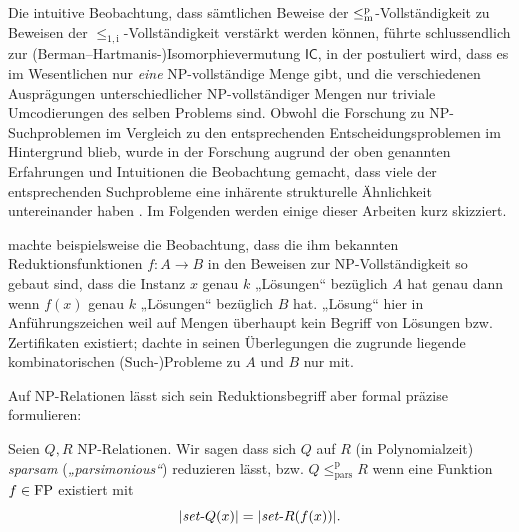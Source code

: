 Die intuitive Beobachtung, dass sämtlichen Beweise der $\leq_\mathrm{m}^\mathrm{p}$-Vollständigkeit zu Beweisen der $\leq_\mathrm{1,i}$-Vollständigkeit verstärkt werden können, führte schlussendlich zur (Berman--Hartmanis-)Isomorphievermutung $\mathsf{IC}$, in der postuliert wird, dass es im Wesentlichen nur \emph{eine} NP-vollständige Menge gibt, und die verschiedenen Ausprägungen unterschiedlicher NP-vollständiger Mengen nur triviale Umcodierungen des selben Problems sind.
Obwohl die Forschung zu NP-Suchproblemen im Vergleich zu den entsprechenden Entscheidungsproblemen im Hintergrund blieb, wurde in der Forschung augrund der oben genannten Erfahrungen und Intuitionen die Beobachtung gemacht, dass viele der entsprechenden Suchprobleme eine inhärente strukturelle Ähnlichkeit untereinander haben \parencite[vgl. auch die Diskussion von][]{hemaspaandra_take-home_1998}.
Im Folgenden werden einige dieser Arbeiten kurz skizziert.

\textcite[83]{simon_central_1975} machte beispielsweise die Beobachtung, dass die ihm bekannten Reduktionsfunktionen $f\colon A\to B$ in den Beweisen zur NP-Vollständigkeit so gebaut sind, dass die Instanz $x$ genau $k$ „Lösungen“ bezüglich $A$ hat genau dann wenn $f(x)$ genau $k$ „Lösungen“ bezüglich $B$ hat. „Lösung“ hier in Anführungszeichen weil auf Mengen überhaupt kein Begriff von Lösungen bzw. Zertifikaten existiert; \citeauthor{simon_central_1975} dachte in seinen Überlegungen die zugrunde liegende kombinatorischen (Such-)Probleme zu $A$ und $B$ nur mit.

Auf NP-Relationen lässt sich sein Reduktionsbegriff aber formal präzise formulieren:
\begin{definition}
    Seien $Q, R$ NP-Relationen. Wir sagen dass sich $Q$ auf $R$ (in Polynomialzeit) \emph{sparsam} (\emph{„parsimonious“}) reduzieren lässt, bzw. $Q\leq_\mathrm{pars}^\mathrm p R$ wenn eine Funktion $f\in\mathrm{FP}$ existiert mit%
    \[ |\mathit{set}\text{-}{}Q(x)|=|\mathit{set}\text{-}{}R(f(x))|. \]
\end{definition}

